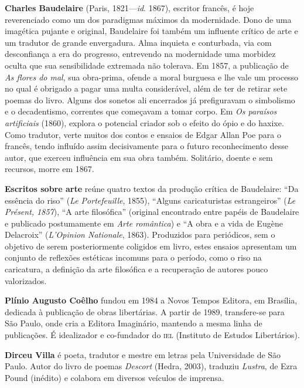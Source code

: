 \textbf{Charles Baudelaire} (Paris, 1821---\textit{id}. 1867), escritor francês, é
 hoje reverenciado como um dos paradigmas máximos da modernidade.
 Dono de uma imagética pujante e original, Baudelaire foi também um
 influente crítico de arte e um tradutor de grande envergadura. Alma
 inquieta e conturbada, via com desconfiança a era do progresso,
 entrevendo na modernidade uma morbidez oculta que sua sensibilidade
 extremada não tolerava. Em 1857, a publicação de \textit{As flores do mal}, sua
 obra-prima, ofende a moral burguesa e lhe vale um processo no qual é
 obrigado a pagar uma multa considerável, além de ter de retirar sete poemas do livro.
 Alguns dos sonetos ali encerrados já prefiguravam o simbolismo e o decadentismo, correntes que começavam a
 tomar corpo. Em \textit{Os paraísos artificiais} (1860), explora o potencial
 criador sob o efeito do ópio e do haxixe. Como tradutor, verte
 muitos dos contos e ensaios de  Edgar Allan Poe para o francês, tendo influído assim decisivamente
 para o futuro reconhecimento desse autor, que 
 exerceu influência em sua obra também. Solitário, doente e sem recursos,
 morre em 1867.

\textbf{Escritos sobre arte} reúne quatro textos da produção crítica de Baudelaire: 
``Da essência do riso'' (\textit{Le Portefeuille}, 1855), ``Alguns caricaturistas estrangeiros'' 
(\textit{Le Présent, 1857}), ``A arte filosófica'' (original encontrado entre papéis 
de Baudelaire e publicado postumamente em \textit{Arte romântica}) e 
``A obra e a vida de Eugène Delacroix'' (\textit{L'Opinion Nationale}, 1863).
Produzidos para periódicos, sem o objetivo de serem posteriormente coligidos em livro,
estes ensaios apresentam um conjunto de reflexões estéticas incomuns para o período, 
como o riso na caricatura, a definição da arte filosófica e a recuperação de autores pouco valorizados. 

\textbf{Plínio Augusto Coêlho} fundou em 1984 a Novos Tempos Editora, em
Brasília, dedicada à publicação de obras libertárias. A partir de
1989, transfere-se para São Paulo, onde cria a Editora Imaginário,
mantendo a mesma linha de publicações. É idealizador
e co-fundador do \textsc{iel} (Instituto de Estudos Libertários).

\textbf{Dirceu Villa} é poeta, tradutor e mestre em letras pela Universidade
de São Paulo. Autor do livro de poemas \textit{Descort} (Hedra, 2003), traduziu
\textit{Lustra}, de Ezra Pound (inédito) e colabora em diversos veículos de imprensa.



